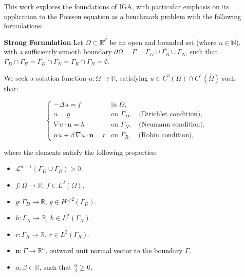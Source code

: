 \documentclass[11pt]{book}
\theoremstyle{plain} %
\theoremstyle{definition} %
\theoremstyle{definition} %
\begin{document}
This work explores the foundations of IGA, with particular emphasis on its application to the Poisson equation as a benchmark problem with the following formulations:

\textbf{Strong Formulation}
Let $\Omega \subset \mathbb{R}^d$ be an open and bounded set (where $n \in \mathbb{N}$), with a sufficiently smooth boundary $\partial\Omega = \Gamma = \overline{\Gamma_D \cup \Gamma_R \cup \Gamma_N}$, such that $\Gamma_D \cap \Gamma_R = \Gamma_D \cap \Gamma_N =  \Gamma_R \cap \Gamma_N = \emptyset$.

We seek a solution function $u: \Omega \to \mathbb{R}$, satisfying $u \in C^2(\Omega) \cap C^1(\overline{\Omega})$ such that: 


\[
\begin{cases}
- \Delta u = f & \text{in } \Omega, \\[6pt]
u = g & \text{on } \Gamma_D, \quad \text{(Dirichlet condition)}, \\[6pt]
\nabla u \cdot \mathbf{n} = h & \text{on } \Gamma_N, \quad \text{(Neumann condition)}, \\[6pt]
\alpha u + \beta \, \nabla u \cdot \mathbf{n} = r & \text{on } \Gamma_R, \quad \text{(Robin condition)},
\end{cases}
\]

\noindent
where the elements satisfy the following properties:

\begin{itemize}
    \item $\mathcal{L}^{n-1}(\Gamma_D \cup \Gamma_R) > 0$.\vspace{-0.1cm}    
    \item ${f: \Omega \to \mathbb{R}}$, $f \in L^2(\Omega)$.\vspace{-0.1cm}
    \item ${g: \Gamma_D \to \mathbb{R}}$, $g \in H^{1/2}(\Gamma_D)$.\vspace{-0.1cm}
    \item ${h: \Gamma_N \to \mathbb{R}}$, $h \in L^2(\Gamma_N)$.\vspace{-0.1cm}
    \item ${r: \Gamma_R \to \mathbb{R}}$, $r \in L^2(\Gamma_R)$.\vspace{-0.1cm}
    \item ${\mathbf{n}: \Gamma \to \mathbb{R}^n}$, outward unit normal vector to the boundary $\Gamma$.\vspace{-0.1cm}
    \item ${\alpha, \beta \in \mathbb{R}}$, such that $\frac{\alpha}{\beta} \geq 0$.
\end{itemize}
\end{document}
